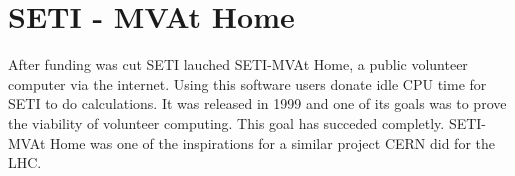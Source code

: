 \section{SETI - MVAt Home}

After funding was cut SETI lauched SETI-MVAt Home, a public volunteer computer 
via the internet. Using this software users donate idle CPU time for SETI to do 
calculations\cite{www-hid-sp18-601-sathome-about}. It was released in 1999 and 
one of its goals was to prove the 
viability of volunteer computing. This goal has succeded completly. SETI-MVAt 
Home was one of the inspirations for a similar project CERN did for the LHC.